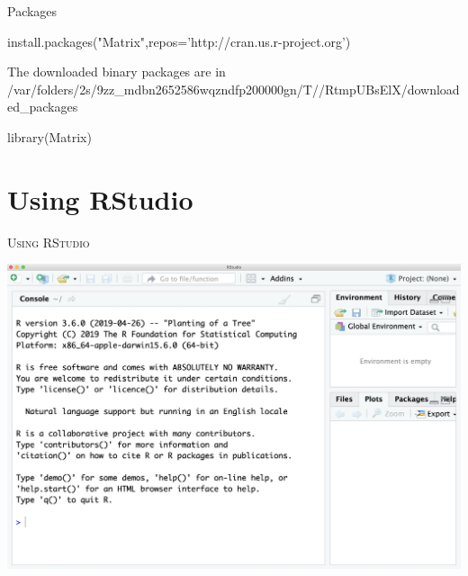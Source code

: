 \documentclass{beamer}\usepackage[]{graphicx}\usepackage[]{color}
\begin{document}
\begin{frame}[fragile]{Packages}
\begin{Schunk}
\begin{Sinput}
install.packages("Matrix",repos='http://cran.us.r-project.org')
\end{Sinput}
\begin{Soutput}

The downloaded binary packages are in
	/var/folders/2s/9zz_mdbn2652586wqzndfp200000gn/T//RtmpUBsElX/downloaded_packages
\end{Soutput}
\begin{Sinput}
library(Matrix)
\end{Sinput}
\end{Schunk}
\end{frame}

\section{Using RStudio}

\begin{frame}[noframenumbering]
  \begin{center}
      \textsc{\textrm{Using RStudio}}
  \end{center}
\end{frame}

\begin{frame}
  \begin{center}
    \includegraphics[width=.9\linewidth]{rstudio}
  \end{center}
\end{frame}

\end{document}
